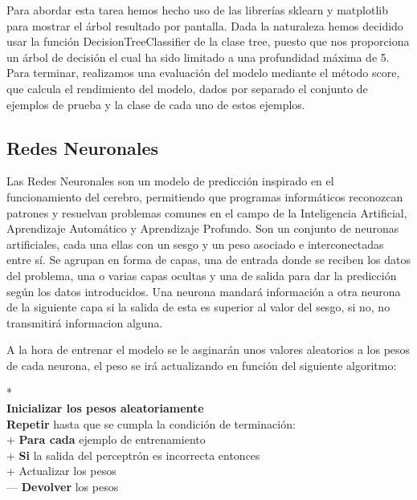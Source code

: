 \documentclass[conference,a4paper]{IEEEtran}
\begin{document}
Para abordar esta tarea hemos hecho uso de las librerías sklearn y matplotlib para mostrar el árbol resultado por pantalla. Dada la naturaleza hemos decidido usar la función DecisionTreeClassifier de la clase tree, puesto que nos proporciona un árbol de decisión el cual ha sido limitado a una profundidad máxima de 5. Para terminar, realizamos una evaluación del modelo mediante el método score, que calcula el rendimiento del modelo, dados por separado el conjunto de ejemplos de prueba y la clase de cada uno de estos ejemplos.


\subsection{Redes Neuronales}

Las Redes Neuronales son un modelo de predicción inspirado en el funcionamiento del cerebro, permitiendo que programas informáticos reconozcan patrones y resuelvan problemas comunes en el campo de la Inteligencia Artificial, Aprendizaje Automático y Aprendizaje Profundo. Son un conjunto de neuronas artificiales, cada una ellas con un sesgo y un peso asociado e interconectadas entre sí. Se agrupan en forma de capas, una de entrada donde se reciben los datos del problema, una o varias capas ocultas y una de salida para dar la predicción según los datos introducidos. Una neurona mandará información a otra neurona de la siguiente capa si la salida de esta es superior al valor del sesgo, si no, no transmitirá informacion alguna.

A la hora de entrenar el modelo se le asginarán unos valores aleatorios a los pesos de cada neurona, el peso se irá actualizando en función del siguiente algoritmo:

\begin{pseudo}*
    \\
    \textbf{\textnormal{Inicializar los pesos aleatoriamente}} \\
    \textbf{Repetir}\textnormal{ hasta que se cumpla la condición de terminación: }\\+
    \textbf{Para cada}\textnormal{ ejemplo de entrenamiento}\\+
    \textbf{Si} \textnormal{la salida del perceptrón es incorrecta entonces}\\+
         \textnormal{Actualizar los pesos}\\---
    \textbf{Devolver}\textnormal{ los pesos}\\
 \end{pseudo}
\end{document}
